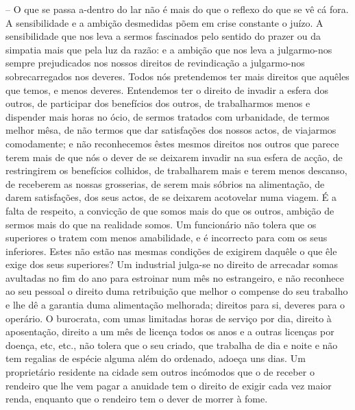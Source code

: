 \documentclass[9pt]{article}
\begin{document}
-- O que se passa a-dentro do lar não é mais do que o reflexo do
que se vê cá fora. A sensibilidade e a ambi\-ção desmedidas põem em
crise constante o juízo. A sensibilidade que nos leva a sermos fascinados pelo sentido do prazer ou da simpatia mais que pela luz da razão:
e a ambi\-ção que nos leva a julgarmo-nos sempre prejudicados nos nossos
direitos de revindica\-ção a julgarmo-nos sobrecarregados nos deveres.
Todos nós pretendemos ter mais direitos que a\-quê\-les que temos, e menos
deveres. Entendemos ter o direito de invadir a esfera dos outros,
de participar dos benefícios dos outros, de traba\-lharmos menos e
dispender mais horas no ócio, de sermos tratados com urbanidade, de
termos me\-lhor mêsa, de não termos que dar satisfa\-ções dos nossos actos,
de viajarmos comodamente; e não reconhecemos êstes mesmos direitos
nos outros que parece terem mais de que nós o dever de se deixarem
invadir na sua esfera de ac\-ção, de restringirem os benefícios co\-lhidos,
de traba\-lharem mais e terem menos descanso, de receberem as nossas grosserias, de serem mais sóbrios na alimenta\-ção, de darem satisfa\-ções, dos seus
actos, de se deixarem acotovelar numa viagem. É a falta de respeito,
a convic\-ção de que somos mais do que os outros, ambi\-ção de sermos mais
do que na realidade somos. Um funcionário não tolera que os superiores
o tratem com menos amabilidade, e é incorrecto para com os seus inferiores. Estes não estão nas mesmas condi\-ções de exigirem da\-quê\-le o
que êle exige dos seus superiores? Um industrial julga-se no direito de arrecadar somas avultadas no fim do ano para estroinar num mês
no estrangeiro, e não reconhece ao seu pessoal o direito duma retribui\-ção que me\-lhor o compense do seu traba\-lho e lhe dê a garantia duma alimenta\-ção me\-lhorada; direitos para si, deveres para o operário. O burocrata, com umas limitadas horas de serviço por dia, direito à aposenta\-ção,
direito a um mês de licença todos os anos e a outras licenças por
doença, etc, etc., não tolera que o seu criado, que traba\-lha de dia e noite e não tem regalias de espécie alguma além do ordenado, adoeça uns
dias. Um proprietário residente na cidade sem outros incómodos que
o de receber o rendeiro que lhe vem pagar a anuidade tem o direito
de exigir cada vez maior renda, enquanto que o rendeiro tem o dever
de morrer à fome.
\end{document}
